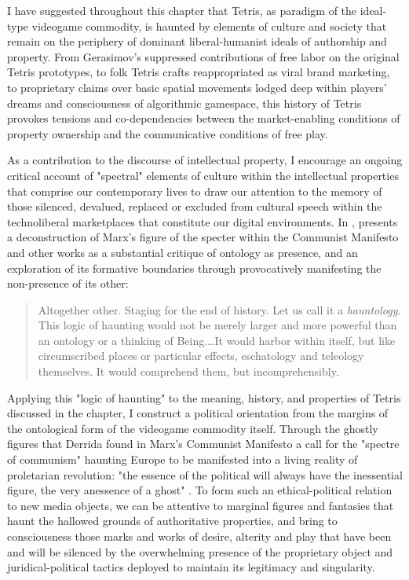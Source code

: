 I have suggested throughout this chapter that Tetris, as paradigm of the ideal-type videogame commodity, is haunted by elements of culture and society that remain on the periphery of dominant liberal-humanist ideals of authorship and property. From Gerasimov's suppressed contributions of free labor on the original Tetris prototypes, to folk Tetris crafts reappropriated as viral brand marketing, to proprietary claims over basic spatial movements lodged deep within players' dreams and consciousness of algorithmic gamespace, this history of Tetris provokes tensions and co-dependencies between the market-enabling conditions of property ownership and the communicative conditions of free play.

As a contribution to the discourse of intellectual property, I encourage an ongoing critical account of "spectral" elements of culture within the intellectual properties that comprise our contemporary lives to draw our attention to the memory of those silenced, devalued, replaced or excluded from cultural speech within the technoliberal marketplaces that constitute our digital environments. In , \citeauthor{Derrida1994-ii} presents a deconstruction of Marx's figure of the specter within the Communist Manifesto and other works as a substantial critique of ontology as presence, and an exploration of its formative boundaries through provocatively manifesting the non-presence of its other:
\blockcquote[10]{Derrida1994-ii}{
  Altogether other. Staging for the end of history. Let us call it a \emph{hauntology}. This logic of haunting would not be merely larger and more powerful than an ontology or a thinking of Being.…It would harbor within itself, but like circumscribed places or particular effects, eschatology and teleology themselves. It would comprehend them, but incomprehensibly.
}
Applying this "logic of haunting" to the meaning, history, and properties of Tetris discussed in the chapter, I construct a political orientation from the margins of the ontological form of the videogame commodity itself. Through the ghostly figures that Derrida found in Marx's Communist Manifesto a call for the "spectre of communism" haunting Europe to be manifested into a living reality of proletarian revolution: "the essence of the political will always have the inessential figure, the very anessence of a ghost" \autocite[127]{Derrida1994-ii}. To form such an ethical-political relation to new media objects, we can be attentive to marginal figures and fantasies that haunt the hallowed grounds of authoritative properties, and bring to consciousness those marks and works of desire, alterity and play that have been and will be silenced by the overwhelming presence of the proprietary object and juridical-political tactics deployed to maintain its legitimacy and singularity.

